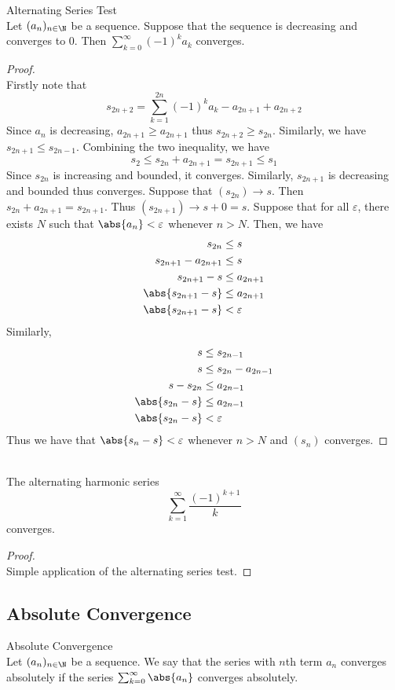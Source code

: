 \documentclass[a4paper]{article}
\begin{document}
\begin{thm}{Alternating Series Test}{}\\
Let $(a_n)_{n\in\N}$ be a sequence. Suppose that the sequence is decreasing and converges to $0$. Then $\sum_{k=0}^\infty(-1)^ka_k$ converges. 
\begin{proof}\\ Firstly note that $$s_{2n+2}=\sum_{k=1}^{2n}(-1)^ka_k-a_{2n+1}+a_{2n+2}$$ Since $a_n$ is decreasing, $a_{2n+1}\geq a_{2n+1}$ thus $s_{2n+2}\geq s_{2n}$. Similarly, we have $s_{2n+1}\leq s_{2n-1}$. Combining the two inequality, we have $$s_2\leq s_{2n}+a_{2n+1}=s_{2n+1}\leq s_1$$ Since $s_{2n}$ is increasing and bounded, it converges. Similarly, $s_{2n+1}$ is decreasing and bounded thus converges. Suppose that $(s_{2n})\to s$. Then $s_{2n}+a_{2n+1}=s_{2n+1}$. Thus $(s_{2n+1})\to s+0=s$. Suppose that for all $\varepsilon$, there exists $N$ such that $\abs{a_{n}}<\varepsilon$ whenever $n>N$. Then, we have
\begin{align*}
s_{2n}&\leq s\\
s_{2n+1}-a_{2n+1}&\leq s\\
s_{2n+1}-s&\leq a_{2n+1}\\
\abs{s_{2n+1}-s}&\leq a_{2n+1}\\
\abs{s_{2n+1}-s}&<\varepsilon\\
\end{align*}
Similarly, 
\begin{align*}
s&\leq s_{2n-1}\\
s&\leq s_{2n}-a_{2n-1}\\
s-s_{2n}&\leq a_{2n-1}\\
\abs{s_{2n}-s}&\leq a_{2n-1}\\
\abs{s_{2n}-s}&<\varepsilon\\
\end{align*}
Thus we have that $\abs{s_n-s}<\varepsilon$ whenever $n>N$ and $(s_n)$ converges. 
\end{proof}
\end{thm}

\begin{eg}{}{}\\ The alternating harmonic series $$\sum_{k=1}^{\infty}\frac{(-1)^{k+1}}{k}$$ converges. 
\begin{proof}\\ Simple application of the alternating series test. 
\end{proof}
\end{eg}

\subsection{Absolute Convergence}
\begin{defn}{Absolute Convergence}{}\\
Let $(a_n)_{n\in\N}$ be a sequence. We say that the series with $n$th term $a_n$ converges absolutely if the series $\sum_{k=0}^\infty\abs{a_n}$ converges absolutely. 
\end{defn}
\end{document}
